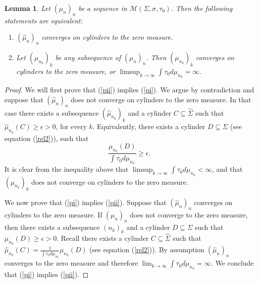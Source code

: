 \documentclass[letterpaper,11pt]{amsart}
\theoremstyle{plain}
\theoremstyle{plain}
\newtheorem{lemma}[proposition]{Lemma}
\theoremstyle{definition}
\theoremstyle{remark}
\def\e{\epsilon}
\def\M{{\mathcal M}}
\begin{document}
\begin{lemma}\label{tozero} Let $(\mu_n)_n$ be a sequence in $\M(\Sigma,\sigma,\tau_0)$. Then the following statements are equivalent:
\begin{enumerate} 
\item\label{pi} $(\hat{\mu}_n)_n$ converges on cylinders to the zero measure.
\item\label{pii} Let  $(\mu_{n_k})_k$ be any subsequence of $(\mu_n)_n$. Then $(\mu_{n_k})_k$ converges on cylinders to the zero measure, or $\limsup_{k\to\infty}\int {\tau_0} d\mu_{n_k}=\infty$.
\end{enumerate}

\end{lemma}
\begin{proof} We will first prove that (\ref{pii}) implies (\ref{pi}). We argue by contradiction and suppose that $(\hat{\mu}_n)_n$ does not converge on cylinders to the zero measure. In that case there exists a subsequence $(\hat{\mu}_{n_k})_k$ and a cylinder $C\subseteq \widehat{\Sigma}$ such that $\hat{\mu}_{n_k}(C)\ge \e>0$, for every $k$. Equivalently, there exists a cylinder $D\subseteq \Sigma$ (see equation (\ref{rel2})), such that  
$$\frac{\mu_{n_k}(D)}{\int {\tau_0} d\mu_{n_k}}\ge \e .$$
It is clear from the inequality above that $\limsup_{k\to\infty}\int {\tau_0} d\mu_{n_k}<\infty$, and that $(\mu_{n_k})_k$ does not converge on cylinders to the zero measure. 

We now prove that (\ref{pi}) implies (\ref{pii}). Suppose that $(\hat{\mu}_n)_n$ converges on cylinders to the zero measure. If $(\mu_n)_n$ does not converge to the zero measure, then there exists a subsequence $(n_k)_k$ and a cylinder $D\subseteq \Sigma$ such that $\mu_{n_k}(D)\ge \e>0$. Recall there exists a cylinder $C\subseteq \widehat{\Sigma}$ such that $\hat{\mu}_{n_k}(C)=\frac{1}{\int{\tau_0} d\mu_{n_k}}\mu_{n_k}(D)$ (see equation (\ref{rel2})). By assumption $(\hat{\mu}_n)_n$ converges to the zero measure and therefore $\lim_{k\to\infty}\int {\tau_0} d\mu_{n_k}=\infty$. We conclude that (\ref{pi}) implies (\ref{pii}).
\end{proof}
\fi




\end{document}
